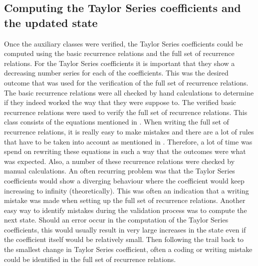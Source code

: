 \subsection{Computing the Taylor Series coefficients and the updated state}
\label{subsec:TaySerCoefverval}
Once the auxiliary classes were verified, the Taylor Series coefficients could be computed using the basic recurrence relations and the full set of recurrence relations. For the Taylor Series coefficients it is important that they show a decreasing number series for each of the coefficients. This was the desired outcome that was used for the verification of the full set of recurrence relations. The basic recurrence relations were all checked by hand calculations to determine if they indeed worked the way that they were suppose to. The verified basic recurrence relations were used to verify the full set of recurrence relations. This class consists of the equations mentioned in . When writing the full set of recurrence relations, it is really easy to make mistakes and there are a lot of rules that have to be taken into account as mentioned in . Therefore, a lot of time was spend on rewriting these equations in such a way that the outcomes were what was expected. Also, a number of these recurrence relations were checked by manual calculations. An often recurring problem was that the Taylor Series coefficients would show a diverging behaviour where the coefficient would keep increasing to infinity (theoretically). This was often an indication that a writing mistake was made when setting up the full set of recurrence relations. Another easy way to identify mistakes during the validation process was to compute the next state. Should an error occur in the computation of the Taylor Series coefficients, this would usually result in very large increases in the state even if the coefficient itself would be relatively small. Then following the trail back to the smallest change in Taylor Series coefficient, often a coding or writing mistake could be identified in the full set of recurrence relations. 

